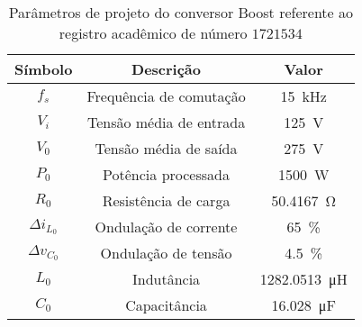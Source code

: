 \begin{table}[!ht]
\centering
\caption{Parâmetros de projeto do conversor Boost referente ao registro acadêmico de número $1721534$}
\label{tab:parametros}
\begin{tabular}{@{}ccc@{}}
\toprule
\textbf{Símbolo} & \textbf{Descrição} & \textbf{Valor}\\ \midrule
$f_s$ & Frequência de comutação & \SI{15}{\kilo\hertz}\\
$V_i$ & Tensão média de entrada  & \SI{125}{\V}\\
$V_0$ & Tensão média de saída  & \SI{275}{\V} \\
$P_0$ & Potência processada  & \SI{1500}{\W} \\
$R_0$ & Resistência de carga & \SI{50.4167}{\ohm} \\
$\Delta{i_{L_0}}$  & Ondulação de corrente & \SI{65}{\%}\\
$\Delta{v_{C_0}}$  & Ondulação de tensão & \SI{4.5}{\%}\\
$L_0$ & Indutância & \SI{1282.0513}{\micro\henry}\\
$C_0$ & Capacitância & \SI{16.028}{\micro\farad}\\
\bottomrule
\end{tabular}
\end{table}

